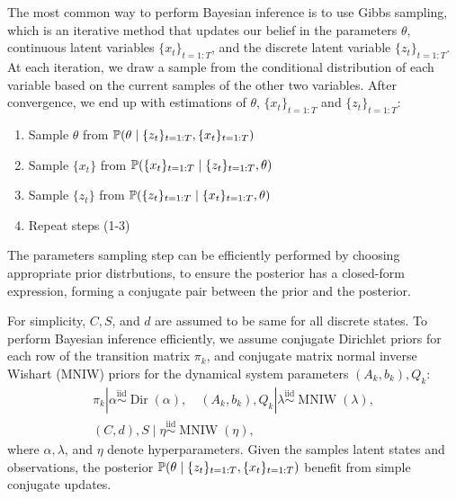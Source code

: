 The most common way to perform Bayesian inference is to use Gibbs sampling, which is an iterative method that updates our belief in the parameters $\theta$, continuous latent variables $\{x_{t}\}_{t=1:T}$, and the discrete latent variable $\{z_t\}_{t=1:T}$. At each iteration, we draw a sample from the conditional distribution of each variable based on the current samples of the other two variables. After convergence, we end up with estimations of $\theta$, $\{x_{t}\}_{t=1:T}$ and $\{z_t\}_{t=1:T}$:
\begin{enumerate}
  \item Sample $\theta$ from $\mathbb{P}(\theta \mid \{z_t\}_{t=1:T}, \{x_{t}\}_{t=1:T})$
  \item Sample $\{x_t\}$ from $\mathbb{P}(\{x_{t}\}_{t=1:T} \mid \{z_t\}_{t=1:T}, \theta)$
  \item Sample $\{z_t\}$ from $\mathbb{P}(\{z_{t}\}_{t=1:T} \mid \{x_t\}_{t=1:T}, \theta)$
 \item Repeat steps (1-3) 
\end{enumerate}
The parameters sampling step can be efficiently performed by choosing appropriate prior distrbutions, to ensure the posterior has a closed-form expression, forming a conjugate pair between the prior and the posterior.
 
For simplicity, $C, S$, and $d$ are assumed to be same for all discrete states. To perform Bayesian inference efficiently, we assume conjugate Dirichlet priors for each row of the transition matrix $\pi_{k}$, and conjugate matrix normal inverse Wishart (MNIW) priors for the dynamical system parameters $\left(A_{k}, b_{k}\right), Q_{k}$:
$$
\begin{gathered}
\pi_{k}\left|\alpha \stackrel{\mathrm{iid}}{\sim} \operatorname{Dir}(\alpha), \quad\left(A_{k}, b_{k}\right), Q_{k}\right| \lambda \stackrel{\mathrm{iid}}{\sim} \operatorname{MNIW}(\lambda), \\
\left(C, d\right), S \mid \eta \stackrel{\mathrm{iid}}{\sim} \operatorname{MNIW}(\eta),
\end{gathered}
$$
where $\alpha, \lambda$, and $\eta$ denote hyperparameters. 
Given the samples latent states and observations, the posterior $\mathbb{P}(\theta \mid \{z_t\}_{t=1:T}, \{x_{t}\}_{t=1:T})$ benefit from simple conjugate updates. 


